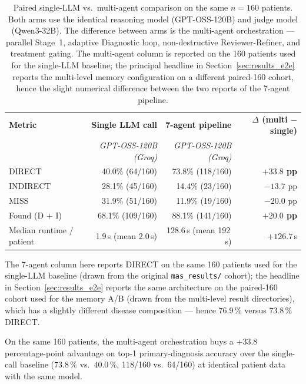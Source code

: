 \begin{table}[!htbp]
\centering
\caption{Paired single-LLM vs.\ multi-agent comparison on the same
$n = 160$ patients. Both arms use the identical reasoning model
(GPT-OSS-120B) and judge model (Qwen3-32B). The difference between
arms is the multi-agent orchestration --- parallel Stage~1,
adaptive Diagnostic loop, non-destructive Reviewer-Refiner, and
treatment gating. The multi-agent column is reported on the 160
patients used for the single-LLM baseline; the principal headline
in Section~\ref{sec:results_e2e} reports the multi-level memory
configuration on a different paired-160 cohort, hence the slight
numerical difference between the two reports of the 7-agent
pipeline.}
\label{tab:single_llm_baseline}
\footnotesize
\begin{tabular}{lrrr}
\toprule
\textbf{Metric}  & \textbf{Single LLM call} & \textbf{7-agent pipeline} & \textbf{$\Delta$ (multi $-$ single)} \\
                 & \footnotesize\textit{GPT-OSS-120B (Groq)} & \footnotesize\textit{GPT-OSS-120B (Groq)} & \\
\midrule
DIRECT           & 40.0\% (64/160)          & 73.8\% (118/160)          & \textbf{$+33.8$ pp} \\
INDIRECT         & 28.1\% (45/160)          & 14.4\% (23/160)           & $-13.7$ pp          \\
MISS             & 31.9\% (51/160)          & 11.9\% (19/160)           & $-20.0$ pp          \\
Found (D $+$ I)  & 68.1\% (109/160)         & 88.1\% (141/160)          & \textbf{$+20.0$ pp} \\
\midrule
Median runtime / patient & 1.9\,s (mean 2.0\,s) & 128.6\,s (mean 192\,s) & $+126.7$\,s \\
\bottomrule
\end{tabular}
\end{table}

The 7-agent column here reports DIRECT on the same 160 patients used
for the single-LLM baseline (drawn from the original
\texttt{mas\_results/} cohort); the headline in
Section~\ref{sec:results_e2e} reports the same architecture on the
paired-160 cohort used for the memory A/B (drawn from the multi-level
result directories), which has a slightly different disease
composition --- hence $76.9\,\%$ versus $73.8\,\%$ DIRECT.

On the same 160 patients, the multi-agent orchestration buys a
$+33.8$ percentage-point advantage on top-1 primary-diagnosis
accuracy over the single-call baseline ($73.8\,\%$ vs.\ $40.0\,\%$,
118/160 vs.\ 64/160) at identical patient data with the same model.

